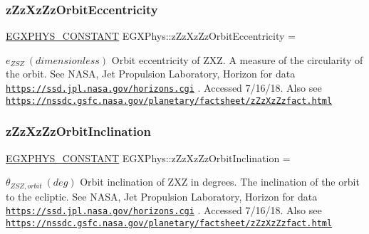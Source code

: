 \subsubsection{\texorpdfstring{z\+Zz\+Xz\+Zz\+Orbit\+Eccentricity}{zZzXzZzOrbitEccentricity}}
{\footnotesize\ttfamily \mbox{\hyperlink{group___e_g_x_phys-_constants-_macros_ga76980d288494ce1714c9ac68a95ba702}{E\+G\+X\+P\+H\+Y\+S\+\_\+\+C\+O\+N\+S\+T\+A\+NT}} E\+G\+X\+Phys\+::z\+Zz\+Xz\+Zz\+Orbit\+Eccentricity =}

$ e_{ZSZ} \ (dimensionless)$ Orbit eccentricity of Z\+XZ. A measure of the circularity of the orbit. See N\+A\+SA, Jet Propulsion Laboratory, Horizon for data \href{https://ssd.jpl.nasa.gov/horizons.cgi}{\tt https\+://ssd.\+jpl.\+nasa.\+gov/horizons.\+cgi} . Accessed 7/16/18. Also see \href{https://nssdc.gsfc.nasa.gov/planetary/factsheet/zZzXzZzfact.html}{\tt https\+://nssdc.\+gsfc.\+nasa.\+gov/planetary/factsheet/z\+Zz\+Xz\+Zzfact.\+html} \mbox{\label{group___e_g_x_phys-_constants-_astrophysics-_solar_system-_z_x_z-_orbit_gaf2b07721417d7d5df2ad03744065b3f2}} 
\subsubsection{\texorpdfstring{z\+Zz\+Xz\+Zz\+Orbit\+Inclination}{zZzXzZzOrbitInclination}}
{\footnotesize\ttfamily \mbox{\hyperlink{group___e_g_x_phys-_constants-_macros_ga76980d288494ce1714c9ac68a95ba702}{E\+G\+X\+P\+H\+Y\+S\+\_\+\+C\+O\+N\+S\+T\+A\+NT}} E\+G\+X\+Phys\+::z\+Zz\+Xz\+Zz\+Orbit\+Inclination =}

$ \theta_{ZSZ,orbit} \ (deg)$ Orbit inclination of Z\+XZ in degrees. The inclination of the orbit to the ecliptic. See N\+A\+SA, Jet Propulsion Laboratory, Horizon for data \href{https://ssd.jpl.nasa.gov/horizons.cgi}{\tt https\+://ssd.\+jpl.\+nasa.\+gov/horizons.\+cgi} . Accessed 7/16/18. Also see \href{https://nssdc.gsfc.nasa.gov/planetary/factsheet/zZzXzZzfact.html}{\tt https\+://nssdc.\+gsfc.\+nasa.\+gov/planetary/factsheet/z\+Zz\+Xz\+Zzfact.\+html} \mbox{\label{group___e_g_x_phys-_constants-_astrophysics-_solar_system-_z_x_z-_orbit_ga59d6cec6c3c4d5d74b85d36f75942e7f}} 
